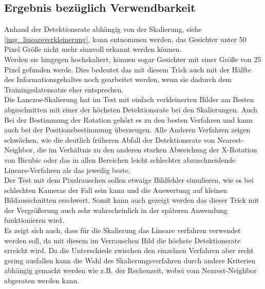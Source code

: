 \subsection{Ergebnis bezüglich Verwendbarkeit}
Anhand der Detektionsrate abhängig von der Skalierung, siehe \autoref{img_lineareverkleinerung}, kann entnommen werden, das Gesichter unter 50 Pixel Größe nicht mehr sinnvoll erkannt werden können.\\
Werden sie hingegen hochskaliert, können sogar Gesichter mit einer Größe von 25 Pixel gefunden werde. Dies bedeutet das mit diesem Trick auch mit der Hälfte des Informationsgehaltes noch gearbeitet werden, wenn sie dadurch dem Trainingsdatensatze eher entsprechen.\\
Die Lanczos-Skalierung hat im Test mit einfach verkleinerten Bilder am Besten abgeschnitten mit einer der höchsten Detektionsrate bei den Skalierungen. Auch Bei der Bestimmung der Rotation gehört es zu den besten Verfahren und kann auch bei der Positionsbestimmung überzeugen. Alle Anderen Verfahren zeigen schwächen, wie die deutlich früheren Abfall der Detektionsrate von Nearest-Neighbor, die im Verhältnis zu den anderen starken Abweichung der X-Rotation von Bicubic oder das in allen Bereichen leicht schlechter abzuschneidende Lineare-Verfahren als das jeweilig beste.\\
Der Test mit dem Pixelrauschen sollen etwaige Bildfehler simulieren, wie es bei schlechten Kameras der Fall sein kann und die Auswertung auf kleinen Bildausschnitten erschwert. Somit kann auch gezeigt werden das dieser Trick mit der Vergrößerung auch sehr wahrscheinlich in der späteren Anwendung funktionieren wird.\\
Es zeigt sich auch, dass für die Skalierung das Lineare verfahren verwendet werden soll, da mit diesem im Verrauschen Bild die höchste Detektionsrate erreicht wird. Da die Unterschiede zwischen den einzelnen Verfahren aber recht gering ausfallen kann die Wahl des Skalierungsverfahren durch andere Kriterien abhängig gemacht werden wie z.B. der Rechenzeit, wobei vom Nearest-Neighbor abgeraten werden kann.